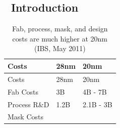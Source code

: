 \documentclass[
]{article}
\begin{document}
\hypertarget{introduction}{%
\subsection{📖 Introduction}\label{introduction}}

\begin{longtable}[]{@{}lll@{}}
\caption{Fab, process, mask, and design costs are much higher at 20nm (IBS,
May 2011)}\tabularnewline
\toprule
\begin{minipage}[b]{0.34\columnwidth}\raggedright
Costs\strut
\end{minipage} & \begin{minipage}[b]{0.26\columnwidth}\raggedright
28nm\strut
\end{minipage} & \begin{minipage}[b]{0.31\columnwidth}\raggedright
20nm\strut
\end{minipage}\tabularnewline
\midrule
\endfirsthead
\toprule
\begin{minipage}[b]{0.34\columnwidth}\raggedright
Costs\strut
\end{minipage} & \begin{minipage}[b]{0.26\columnwidth}\raggedright
28nm\strut
\end{minipage} & \begin{minipage}[b]{0.31\columnwidth}\raggedright
20nm\strut
\end{minipage}\tabularnewline
\midrule
\endhead
\begin{minipage}[t]{0.34\columnwidth}\raggedright
Fab Costs\strut
\end{minipage} & \begin{minipage}[t]{0.26\columnwidth}\raggedright
3B\strut
\end{minipage} & \begin{minipage}[t]{0.31\columnwidth}\raggedright
4B - 7B\strut
\end{minipage}\tabularnewline
\begin{minipage}[t]{0.34\columnwidth}\raggedright
Process R\&D\strut
\end{minipage} & \begin{minipage}[t]{0.26\columnwidth}\raggedright
1.2B\strut
\end{minipage} & \begin{minipage}[t]{0.31\columnwidth}\raggedright
2.1B - 3B\strut
\end{minipage}\tabularnewline
\begin{minipage}[t]{0.34\columnwidth}\raggedright
Mask Costs\strut
\end{minipage} & \begin{minipage}[t]{0.26\columnwidth}\raggedright

\end{minipage}
\end{longtable}
\end{document}
